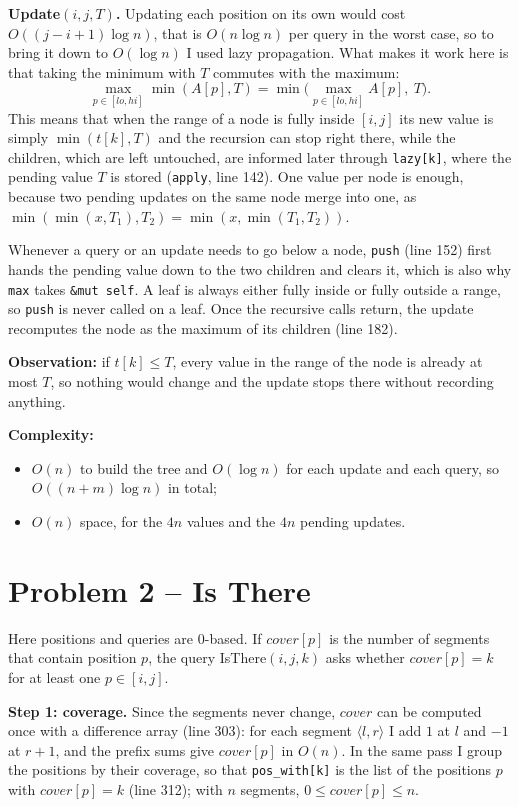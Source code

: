 \documentclass[11pt,a4paper]{article}
\begin{document}
\textbf{Update$(i,j,T)$.} Updating each position on its own would cost $O((j-i+1)\log n)$, that is
$O(n \log n)$ per query in the worst case, so to bring it down to $O(\log n)$ I used lazy propagation. What
makes it work here is that taking the minimum with $T$ commutes with the maximum:
\[ \max_{p \in [lo,hi]} \min(A[p], T) = \min\Big(\max_{p \in [lo,hi]} A[p],\ T\Big). \]
This means that when the range of a node is fully inside $[i,j]$ its new value is simply $\min(t[k], T)$
and the recursion can stop right there, while the children, which are left untouched, are informed later
through \texttt{lazy[k]}, where the pending value $T$ is stored (\texttt{apply}, line 142). One value per
node is enough, because two pending updates on the same node merge into one, as
$\min(\min(x, T_1), T_2) = \min(x, \min(T_1, T_2))$.

Whenever a query or an update needs to go below a node, \texttt{push} (line 152) first hands the pending value
down to the two children and clears it, which is also why \texttt{max} takes \texttt{\&mut self}. A leaf is
always either fully inside or fully outside a range, so \texttt{push} is never called on a leaf. Once the
recursive calls return, the update recomputes the node as the maximum of its children (line 182).

\textbf{Observation:} if $t[k] \le T$, every value in the range of the node is already at most $T$, so
nothing would change and the update stops there without recording anything.

\textbf{Complexity:}
\begin{itemize}
\item $O(n)$ to build the tree and $O(\log n)$ for each update and each query, so $O((n+m)\log n)$ in total;
\item $O(n)$ space, for the $4n$ values and the $4n$ pending updates.
\end{itemize}

\section*{Problem 2 -- Is There}

Here positions and queries are 0-based. If $\mathit{cover}[p]$ is the number of segments that contain
position $p$, the query IsThere$(i,j,k)$ asks whether $\mathit{cover}[p] = k$ for at least one $p \in [i,j]$.

\textbf{Step 1: coverage.} Since the segments never change, $\mathit{cover}$ can be computed once with a
difference array (line 303): for each segment $\langle l, r\rangle$ I add $1$ at $l$ and $-1$ at $r+1$, and
the prefix sums give $\mathit{cover}[p]$ in $O(n)$. In the same pass I group the positions by their
coverage, so that \texttt{pos\_with[k]} is the list of the positions $p$ with $\mathit{cover}[p] = k$
(line 312); with $n$ segments, $0 \le \mathit{cover}[p] \le n$.
\end{document}
